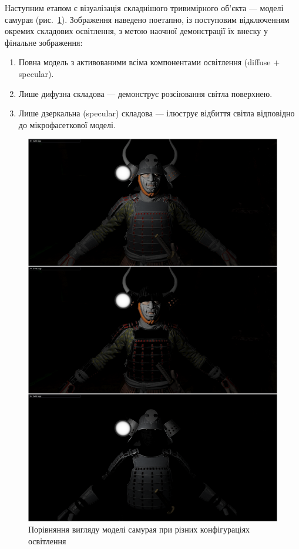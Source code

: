 \par Наступним етапом є візуалізація складнішого тривимірного об’єкта — моделі самурая (рис.~\ref{fig:samurai_full}). Зображення наведено поетапно, із поступовим відключенням окремих складових освітлення, з метою наочної демонстрації їх внеску у фінальне зображення:

\begin{enumerate}
\item Повна модель з активованими всіма компонентами освітлення (diffuse + specular).
\item Лише дифузна складова — демонструє розсіювання світла поверхнею.
\item Лише дзеркальна (specular) складова — ілюструє відбиття світла відповідно до мікрофасеткової моделі.
\end{enumerate}

\begin{figure}[h]
\centering
\includegraphics[scale=0.35]{Pictures/Samuraifull.png}
\caption{Порівняння вигляду моделі самурая при різних конфігураціях освіт\-лен\-ня}
\label{fig:samurai_full}
\end{figure}

